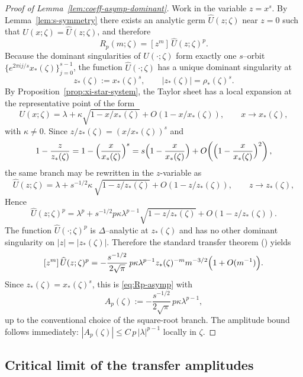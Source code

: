 \documentclass[11pt]{amsart}
\numberwithin{equation}{section}
\theoremstyle{plain}
\theoremstyle{definition}
\theoremstyle{remark}
\begin{document}
\begin{proof}[Proof of Lemma~\ref{lem:coeff-asymp-dominant}]
	Work in the variable $z=x^s$. By Lemma~\ref{lem:s-symmetry} there exists an analytic germ
	$\widehat U(z;\zeta)$ near $z=0$ such that $U(x;\zeta)=\widehat U(z;\zeta)$, and therefore
	\[
	R_p(m;\zeta)=[z^m]\,\widehat U(z;\zeta)^p.
	\]
	Because the dominant singularities of $U(\cdot;\zeta)$ form exactly one $s$--orbit
	$\{e^{2\pi i j/s}x_*(\zeta)\}_{j=0}^{s-1}$, the function $\widehat U(\cdot;\zeta)$ has a unique dominant
	singularity at
	\[
		z_*(\zeta):=x_*(\zeta)^s,
		\qquad |z_*(\zeta)|=\rho_*(\zeta)^s.
	\]
	By Proposition~\ref{prop:xi-star-system}, the Taylor sheet has a local expansion at the representative
	point of the form
	\[
		U(x;\zeta)=\lambda+\kappa\sqrt{1-x/x_*(\zeta)}+O\!\left(1-x/x_*(\zeta)\right),
		\qquad x\to x_*(\zeta),
	\]
	with $\kappa\neq0$. Since $z/z_*(\zeta)=(x/x_*(\zeta))^s$ and
	\[
		1-\frac{z}{z_*(\zeta)}=1-\Bigl(\frac{x}{x_*(\zeta)}\Bigr)^s
		=s\Bigl(1-\frac{x}{x_*(\zeta)}\Bigr)+O\!\left(\Bigl(1-\frac{x}{x_*(\zeta)}\Bigr)^2\right),
	\]
	the same branch may be rewritten in the $z$-variable as
	\[
		\widehat U(z;\zeta)
		=
		\lambda+s^{-1/2}\kappa\,\sqrt{1-z/z_*(\zeta)}+O\!\left(1-z/z_*(\zeta)\right),
		\qquad z\to z_*(\zeta),
	\]
	Hence
	\[
	\widehat U(z;\zeta)^p
		=
	\lambda^p+s^{-1/2}p\kappa\lambda^{p-1}\sqrt{1-z/z_*(\zeta)}+O\!\left(1-z/z_*(\zeta)\right).
	\]
	The function $\widehat U(\cdot;\zeta)^p$ is $\Delta$--analytic at $z_*(\zeta)$ and has no other dominant
	singularity on $|z|=|z_*(\zeta)|$. Therefore the standard transfer theorem
	(\cite[Ch.~VI, Thm.~VI.3]{FlajoletSedgewick2009}) yields
	\[
		[z^m]\,\widehat U(z;\zeta)^p
		=
		-\frac{s^{-1/2}}{2\sqrt{\pi}}\,p\kappa\lambda^{p-1}
		z_*(\zeta)^{-m}m^{-3/2}\Bigl(1+O(m^{-1})\Bigr).
	\]
	Since $z_*(\zeta)=x_*(\zeta)^s$, this is \eqref{eq:Rp-asymp} with
	\[
	A_p(\zeta):=-\frac{s^{-1/2}}{2\sqrt{\pi}}\,p\kappa\lambda^{p-1},
	\]
	up to the conventional choice of the square-root branch. The amplitude bound follows immediately:
	$|A_p(\zeta)|\le C\,p\,|\lambda|^{p-1}$ locally in $\zeta$.
\end{proof}

\subsection{Critical limit of the transfer amplitudes}
\label{app:transfer-critical}
\end{document}
